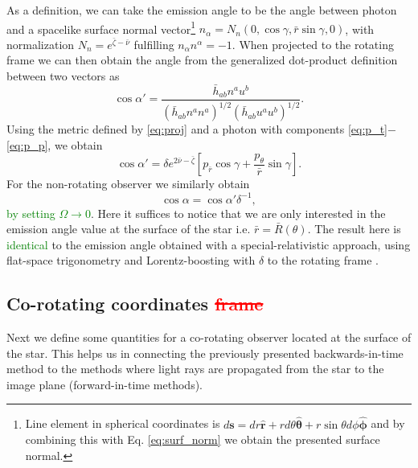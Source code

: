 \documentclass{aa}
\newcommand{\be}{\begin{equation}}
\newcommand{\ee}{\end{equation}}
\renewcommand{\vec}[1]{\ensuremath{\boldsymbol{#1}}}
\newcommand{\refe}[1]{\textcolor{green}{{#1}}}
\newcommand{\refedel}[1]{\textcolor{red}{\sout{#1}}}
\newcommand{\rb}{\ensuremath{\bar{r}}}
\newcommand{\nub}{\ensuremath{\bar{\nu}}}
\newcommand{\zetab}{\ensuremath{\bar{\zeta}}}
\begin{document}
As a definition, we can take the emission angle to be the angle between photon and a spacelike surface normal vector\footnote{
Line element in spherical coordinates is $d\vec{s} = dr \vec{\hat{r}} + r d\theta \vec{\hat{\theta}} + r \sin\theta d\phi \vec{\hat{\phi}}$ and by combining this with Eq. \eqref{eq:surf_norm} we obtain the presented surface normal.
}
$n_{\alpha} = N_n (0, \cos\gamma, \rb \sin\gamma, 0)$, with normalization $N_n = e^{\zetab - \nub}$ fulfilling $n_{\alpha}n^{\alpha} = -1$.  
When projected to the rotating frame we can then obtain the angle from the generalized dot-product definition between two vectors as
\be\label{eq:gen_angle}
\cos\alpha' = \frac{\bar{h}_{ab}n^a u^b}{(\bar{h}_{ab} n^a n^a)^{1/2} (\bar{h}_{ab} u^a u^b)^{1/2}}.
\ee
Using the metric defined by \eqref{eq:proj} and a photon with components \eqref{eq:p_t}$-$\eqref{eq:p_p}, we obtain
\be\label{eq:cosap}
\cos\alpha' = \delta e^{2\nub-\zetab} \left[ p_{\rb} \cos\gamma + \frac{p_{\theta}}{\rb}\sin\gamma \right].
\ee
For the non-rotating observer we similarly obtain 
\be\label{eq:cosa}
\cos\alpha = \cos\alpha' \delta^{-1},
\ee
\refe{by setting $\Omega \rightarrow 0$}.
Here it suffices to notice that we are only interested in the emission angle value at the surface of the star i.e. $\rb = \bar{R}(\theta)$.
The result here is \refe{identical} to the emission angle obtained with a special-relativistic approach, using flat-space trigonometry and Lorentz-boosting with $\delta$ to the rotating frame \citep[see e.g.,][]{PB06}.



\subsection{Co-rotating coordinates \refedel{frame}}\label{sect:coords}
Next we define some quantities for a co-rotating observer located at the surface of the star.
This helps us in connecting the previously presented backwards-in-time method to the methods where light rays are propagated from the star to the image plane (forward-in-time methods).
\end{document}
